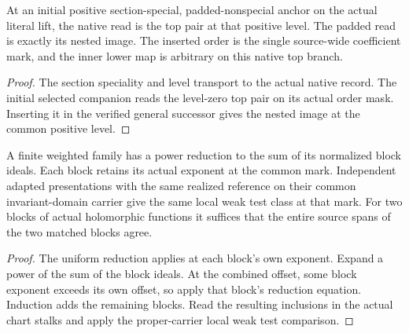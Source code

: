 \begin{theorem}
\label{hir:g1-original-initial-positive-nested-top}
\leanok
At an initial positive section-special, padded-nonspecial anchor
on the actual literal lift, the native read is the top pair at
that positive level. The padded read is exactly its nested image.
The inserted order is the single source-wide coefficient mark, and
the inner lower map is arbitrary on this native top branch.
\end{theorem}
\begin{proof}
The section speciality and level transport to the actual native
record. The initial selected companion reads the level-zero top
pair on its actual order mask. Inserting it in the verified general
successor gives the nested image at the common positive level.
\end{proof}

\begin{theorem}
\label{hir:g1-finite-weight-block-reductions}
\leanok
A finite weighted family has a power reduction to the sum of
its normalized block ideals. Each block retains its actual
exponent at the common mark. Independent adapted presentations
with the same realized reference on their common invariant-domain
carrier give the same local weak test class at that mark.
For two blocks of actual holomorphic functions it suffices that
the entire source spans of the two matched blocks agree.
\end{theorem}
\begin{proof}
The uniform reduction applies at each block's own exponent.
Expand a power of the sum of the block ideals. At the combined
offset, some block exponent exceeds its own offset, so apply that
block's reduction equation. Induction adds the remaining blocks.
Read the resulting inclusions in the actual chart stalks and
apply the proper-carrier local weak test comparison.
\end{proof}

